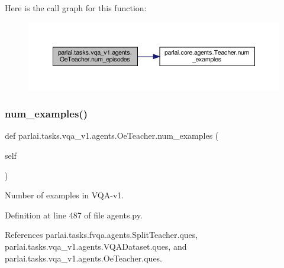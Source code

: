 Here is the call graph for this function\+:
\nopagebreak
\begin{figure}[H]
\begin{center}
\leavevmode
\includegraphics[width=350pt]{classparlai_1_1tasks_1_1vqa__v1_1_1agents_1_1OeTeacher_aa932b35d88d65d7f5d61b271bbee71ac_cgraph}
\end{center}
\end{figure}
\mbox{\label{classparlai_1_1tasks_1_1vqa__v1_1_1agents_1_1OeTeacher_acc1841e8be4613043d9674d014e06f70}} 
\subsubsection{\texorpdfstring{num\+\_\+examples()}{num\_examples()}}
{\footnotesize\ttfamily def parlai.\+tasks.\+vqa\+\_\+v1.\+agents.\+Oe\+Teacher.\+num\+\_\+examples (\begin{DoxyParamCaption}\item[{}]{self }\end{DoxyParamCaption})}

\begin{DoxyVerb}Number of examples in VQA-v1.\end{DoxyVerb}
 

Definition at line 487 of file agents.\+py.



References parlai.\+tasks.\+fvqa.\+agents.\+Split\+Teacher.\+ques, parlai.\+tasks.\+vqa\+\_\+v1.\+agents.\+V\+Q\+A\+Dataset.\+ques, and parlai.\+tasks.\+vqa\+\_\+v1.\+agents.\+Oe\+Teacher.\+ques.

\mbox{\label{classparlai_1_1tasks_1_1vqa__v1_1_1agents_1_1OeTeacher_a5541625a47721863f58db94177ce1114}} 
